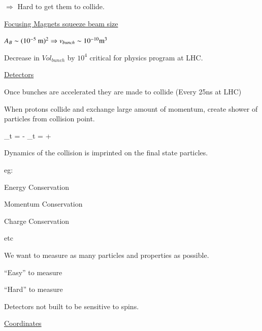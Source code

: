 {$\Rightarrow$ Hard to get them to collide.


\underline{Focusing Magnets squeeze beam size}

$A_B \sim (10^{-5}\ \textrm{m})^2 \Rightarrow v_{bunch} \sim 10^{-10} \textrm{m}^3$

Decrease in $Vol_{bunch}$ by $10^4$ critical for physics program at LHC.

\lineacross

\underline{Detectors}

Once bunches are accelerated they are made to collide (Every 25ns at LHC)

When protons collide and exchange large amount of momentum, create shower of particles from collision point.

\be
{}_{t = -\infty} \rightarrow {}_{t = +\infty}
\ee

Dynamics of the collision is imprinted on the final state particles.

eg:
\bi
\item[-] Energy Conservation
\item[-] Momentum Conservation
\item[-] Charge Conservation 
\item[-] etc
\ei

We want to measure as many particles and properties as possible.

``Easy'' to measure 

``Hard'' to measure 

Detectors not built to be sensitive to spins.


\underline{Coordinates}

}
